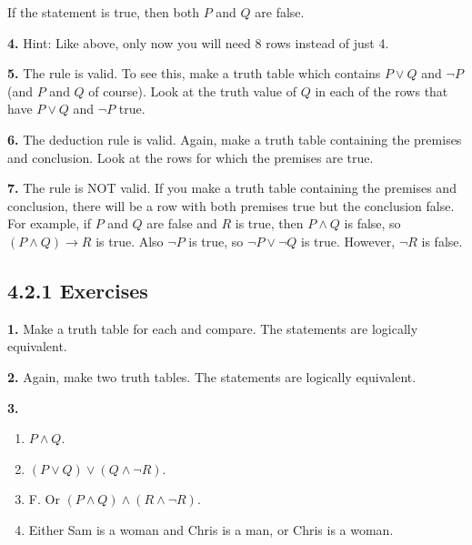 \documentclass[10pt,]{book}
\theoremstyle{plain}
\theoremstyle{definition}
\theoremstyle{definition}
\theoremstyle{definition}
\numberwithin{equation}{chapter}
\def\imp{\rightarrow}
\begin{document}
              If the statement is true, then both \(P\) and \(Q\) are false.
\par\smallskip
\noindent\textbf{4.}\quad{}
              Hint: Like above, only now you will need 8 rows instead of just 4.
\par\smallskip
\noindent\textbf{5.}\quad{}
              The rule is valid. To see this, make a truth table which contains \(P \vee Q\) and \(\neg P\) (and \(P\) and \(Q\) of course). Look at the truth value of \(Q\) in each of the rows that have \(P \vee Q\) and \(\neg P\) true.
\par\smallskip
\noindent\textbf{6.}\quad{}
              The deduction rule is valid. Again, make a truth table containing the premises and conclusion. Look at the rows for which the premises are true.
\par\smallskip
\noindent\textbf{7.}\quad{}
              The rule is NOT valid. If you make a truth table containing the premises and conclusion, there will be a row with both premises true but the conclusion false. For example, if \(P\) and \(Q\) are false and \(R\) is true, then \(P \wedge Q\) is false, so \((P \wedge Q) \imp R\) is true. Also \(\neg P\) is true, so \(\neg P \vee \neg Q\) is true. However, \(\neg R\) is false.
\par\smallskip
\subsection*{4.2.1 Exercises}
\noindent\textbf{1.}\quad{}
          Make a truth table for each and compare. The statements are logically equivalent.
\par\smallskip
\noindent\textbf{2.}\quad{}
          Again, make two truth tables. The statements are logically equivalent.
\par\smallskip
\noindent\textbf{3.}\quad{}\leavevmode%
\begin{enumerate}[label=(\alph*)]
\item\hypertarget{li-1065}{}\(P \wedge Q\).%
\item\hypertarget{li-1066}{}\((P \vee Q) \vee (Q \wedge \neg R)\).%
\item\hypertarget{li-1067}{} F. Or \((P \wedge Q) \wedge (R \wedge \neg R)\). %
\item\hypertarget{li-1068}{} Either Sam is a woman and Chris is a man, or Chris is a woman. %
\end{enumerate}
\par\smallskip
\end{document}

